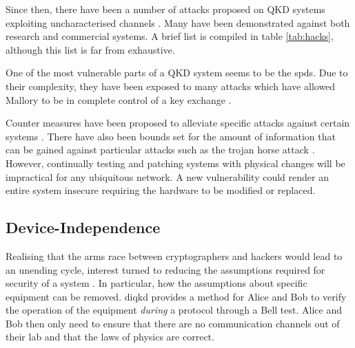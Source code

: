Since then, there have been a number of attacks proposed on \ac{QKD} systems exploiting uncharacterised channels \cite{xu2019quantum}. Many have been demonstrated against both research and commercial systems. A brief list is compiled in table \ref{tab:hacks}, although this list is far from exhaustive. 


One of the most vulnerable parts of a \ac{QKD} system seems to be the \acp{spd}. Due to their complexity, they have been exposed to many attacks which have allowed Mallory to be in complete control of a key exchange \cite{Makarov2006, Gerhardt2011a, Lydersen2010a, Lydersen2010b, Lydersen2011, Sauge2011, Makarov2009, Wiechers2011}.


Counter measures have been proposed to alleviate specific attacks against certain systems \cite{Lydersen2010c, Yuan2010}. There have also been bounds set for the amount of information that can be gained against particular attacks such as the trojan horse attack \cite{Lucamarini2015Practical}. However, continually testing and patching systems with physical changes will be impractical for any ubiquitous network. A new vulnerability could render an entire system insecure requiring the hardware to be modified or replaced.


\subsection{Device-Independence}

Realising that the arms race between cryptographers and hackers would lead to an unending cycle, interest turned to reducing the assumptions required for security of a system \cite{Mayers1998, Acin2007, Barrett2005}. In particular, how the assumptions about specific equipment can be removed. \Ac{diqkd} provides a method for Alice and Bob to verify the operation of the equipment \emph{during} a protocol through a Bell test. Alice and Bob then only need to ensure that there are no communication channels out of their lab and that the laws of physics are correct. 

